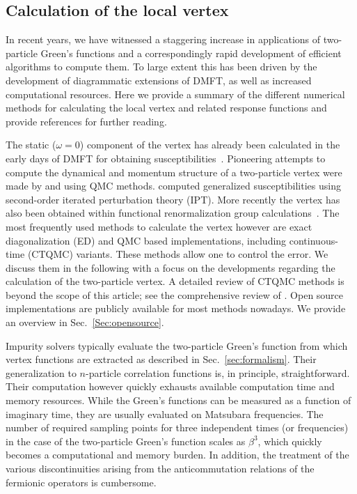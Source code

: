 \documentclass[rmp,aps,reprint,amsmath,amssymb,superscriptaddress,showpacs,nofootinbib]{revtex4-1}
\begin{document}
\subsection{Calculation of the local vertex}
\label{sec:calver}

In recent years, we have witnessed a staggering increase in applications of two-particle Green's functions and a correspondingly rapid development of efficient algorithms to compute them. To large extent this has been driven by the development of diagrammatic extensions of DMFT, as well as increased computational resources. Here we provide a summary of the different numerical methods for calculating the local vertex and related response functions and provide references for further reading. 
 
The static ($\omega=0$) component of the vertex has already been calculated in the early days of DMFT for obtaining susceptibilities~\cite{Jarrell1992}. Pioneering attempts to compute the dynamical and momentum structure of a two-particle vertex were made by  and  using QMC methods.  computed generalized susceptibilities using second-order iterated perturbation theory (IPT). More recently the vertex has also been obtained within functional renormalization group calculations~\cite{Kinza2013}. The most frequently used methods to calculate the vertex however are exact diagonalization (ED) and QMC based implementations, including continuous-time (CTQMC) variants. These methods allow one to control the error. We discuss them in the following with a focus on the developments regarding the calculation of the two-particle vertex. A detailed review of CTQMC methods is beyond the scope of this article; see the comprehensive review of . Open source implementations are publicly available for most methods nowadays. We provide an overview in Sec.~\ref{Sec:opensource}.

Impurity solvers typically evaluate the two-particle Green's function from which vertex functions are extracted as described in Sec.~\ref{sec:formalism}. Their generalization to $n$-particle correlation functions is, in principle, straightforward. Their computation however quickly exhausts available computation time and memory resources. While the Green's functions can be measured as a function of imaginary time, they are usually evaluated on Matsubara frequencies. The number of required sampling points for three independent times (or frequencies) in the case of the two-particle Green's function scales as $\beta^{3}$, which quickly becomes a computational and memory burden. In addition, the treatment of the various discontinuities arising from the anticommutation relations of the fermionic operators is cumbersome.
\end{document}
